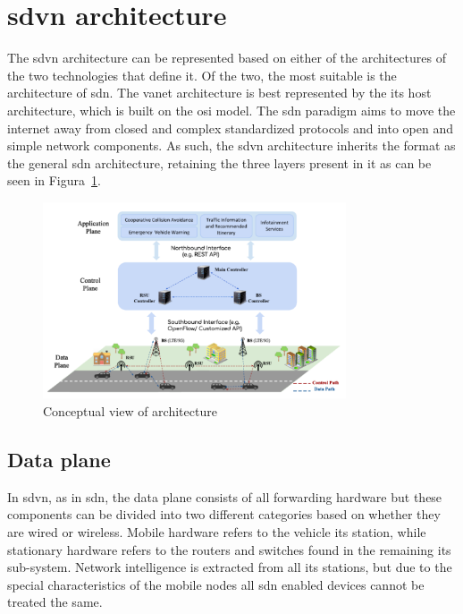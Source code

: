 \section[SDVN architecture]{\gls{sdvn} architecture}

The \gls{sdvn} architecture can be represented based on either of the architectures of the two technologies that define it. Of the two, the most suitable is the architecture of \gls{sdn}. The \gls{vanet} architecture is best represented by the \gls{its} host architecture, which is built on the \gls{osi} model. The \gls{sdn} paradigm aims to move the internet away from closed and complex standardized protocols and into open and simple network components. As such, the \gls{sdvn} architecture inherits the format as the general \gls{sdn} architecture, retaining the three layers present in it as can be seen in Figura~\ref{fig:sdvn_arciotecture}. 

\begin{figure}
	\centering
	\includegraphics[width=0.8\textwidth]{Chapters/Figures/SDVNs/architecture.png}
	\caption{Conceptual view of  architecture~\cite{toufga_towards_2020}}
	\label{fig:sdvn_arciotecture}
\end{figure}

\subsection{Data plane}

In \gls{sdvn}, as in \gls{sdn}, the data plane consists of all forwarding hardware but these components can be divided into two different categories based on whether they are wired or wireless. Mobile hardware refers to the vehicle \gls{its} station, while stationary hardware refers to the routers and switches found in the remaining \gls{its} sub-system. Network intelligence is extracted from all \gls{its} stations, but due to the special characteristics of the mobile nodes all \gls{sdn} enabled devices cannot be treated the same. 

